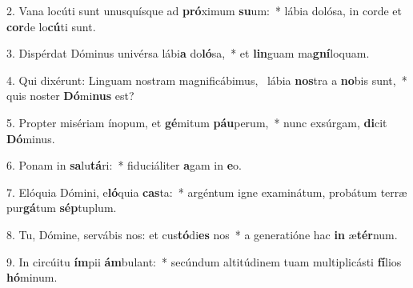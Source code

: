 2. Vana locúti sunt unusquísque ad \textbf{pró}ximum \textbf{su}um:~*  lábia dolósa, in corde et \textbf{cor}de lo\textbf{cú}ti sunt.\

3. Dispérdat Dóminus univérsa lábi\textbf{a} do\textbf{ló}sa,~*  et \textbf{lin}guam ma\textbf{gní}loquam.\

4. Qui dixérunt: Linguam nostram magnificábimus, \dag\  lábia \textbf{nos}tra a \textbf{no}bis sunt,~*  quis noster \textbf{Dó}mi\textbf{nus} est?\

5. Propter misériam ínopum, et \textbf{gé}mitum \textbf{páu}perum,~*  nunc exsúrgam, \textbf{di}cit \textbf{Dó}minus.\

6. Ponam in \textbf{sa}lu\textbf{tá}ri:~*  fiduciáliter \textbf{a}gam in \textbf{e}o.\

7. Elóquia Dómini, e\textbf{ló}quia \textbf{cas}ta:~*  argéntum igne examinátum, probátum terræ pur\textbf{gá}tum \textbf{sép}tuplum.\

8. Tu, Dómine, servábis nos: et cus\textbf{tó}di\textbf{es} nos~*  a generatióne hac \textbf{in} æ\textbf{tér}num.\

9. In circúitu \textbf{ím}pii \textbf{ám}bulant:~*  secúndum altitúdinem tuam multiplicásti \textbf{fí}lios \textbf{hó}minum.\

